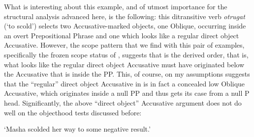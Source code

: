 \documentclass[output=paper,colorlinks,citecolor=brown,modfonts,nonflat]{langsci/langscibook}
\begin{document}
What is interesting about this example, and of utmost importance for the structural analysis advanced here, is the following: this ditransitive verb \textit{otrugat} (‘to scold’) selects two Accusative-marked objects, one Oblique, occurring inside an overt Prepositional Phrase and one which looks like a regular direct object Accusative. However, the scope pattern that we find with this pair of examples, specifically the frozen scope status of , suggests that  is the {derived} order, that is, what looks like the regular direct object Accusative must have originated below the Accusative that is inside the PP. This, of course, on my assumptions suggests that the “regular” direct object Accusative in  is in fact a concealed low Oblique Accusative, which originates inside a null PP and thus gets its case from a null P head. Significantly, the above “direct object” Accusative argument does not do well on the objecthood tests discussed before:


\ea%
    \label{ex:antonyuk:55}

    \glt    `Masha scolded her way to some negative result.'
    \z
\z
\end{document}
